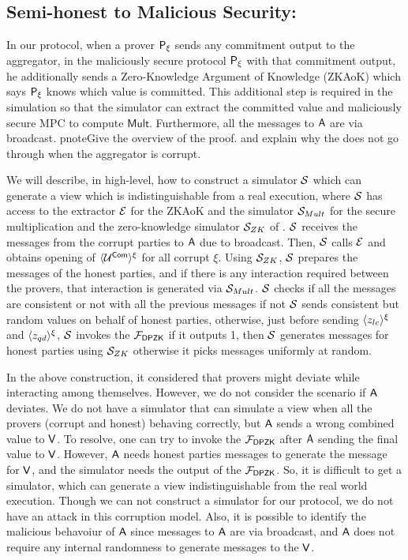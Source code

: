 \subsection{Semi-honest to Malicious Security: }\label{sec:semi-honesttomalicious} In our protocol, when a prover $\mathsf{P}_\xi$ sends any commitment output to the aggregator, in the maliciously secure protocol $\mathsf{P}_\xi$ with that commitment output, he additionally sends a Zero-Knowledge Argument of Knowledge (ZKAoK) which says $\mathsf{P}_\xi$ knows which value is committed. This additional step is required in the simulation so that the simulator can extract the committed value and maliciously secure MPC to compute $\mathsf{Mult}$. Furthermore, all the messages to $\mathsf{A}$ are via broadcast. 
pnote{Give the overview of the proof. and explain why the does not go through when the aggregator is corrupt.}

 We will describe, in high-level, how to construct a simulator $\mathcal{S}$ which can generate a view which is indistinguishable from a real execution, where $\mathcal{S}$ has access to the extractor $\mathcal{E}$ for the ZKAoK and the simulator $\mathcal{S}_{Mult}$ for the secure multiplication and the zero-knowledge simulator $\mathcal{S}_{ZK}$ of \name. $\mathcal{S}$ receives the messages from the corrupt parties to $\mathsf{A}$ due to broadcast. Then, $\mathcal{S}$ calls $\mathcal{E}$ and obtains opening of $\langle{\mathcal{U}^{\mathsf{Com}}}\rangle^\xi$ for all corrupt $\xi$. Using $\mathcal{S}_{ZK}$, $\mathcal{S}$ prepares the messages of the honest parties, and if there is any interaction required between the provers, that interaction is generated via $\mathcal{S}_{Mult}$. $\mathcal{S}$ checks if all the messages are consistent or not with all the previous messages if not $\mathcal{S}$ sends consistent but random values on behalf of honest parties, otherwise, just before sending $\langle{z_{lc}}\rangle^\xi$ and $\langle{z_{qd}}\rangle^\xi$, $\mathcal{S}$ invokes the $\mathcal{F}_{\mathsf{DPZK}}$ if it outputs 1, then $\mathcal{S}$ generates messages for honest parties using $\mathcal{S}_{ZK}$ otherwise it picks messages uniformly at random.

  In the above construction, it considered that provers might deviate while interacting among themselves. However, we do not consider the scenario if $\mathsf{A}$ deviates. We do not have a simulator that can simulate a view when all the provers (corrupt and honest) behaving correctly, but $\mathsf{A}$ sends a wrong combined value to $\mathsf{V}$. To resolve, one can try to invoke the $\mathcal{F}_{\mathsf{DPZK}}$ after $\mathsf{A}$ sending the final value to $\mathsf{V}$. However, $\mathsf{A}$ needs honest parties messages to generate the message for $\mathsf{V}$, and the simulator needs the output of the $\mathcal{F}_{\mathsf{DPZK}}$. So, it is difficult to get a simulator, which can generate a view indistinguishable from the real world execution. Though we can not construct a simulator for our protocol, we do not have an attack in this corruption model. Also, it is possible to identify the malicious behavoiur of $\mathsf{A}$ since messages to $\mathsf{A}$ are via broadcast, and $\mathsf{A}$ does not require any internal randomness to generate messages to the $\mathsf{V}$. 

